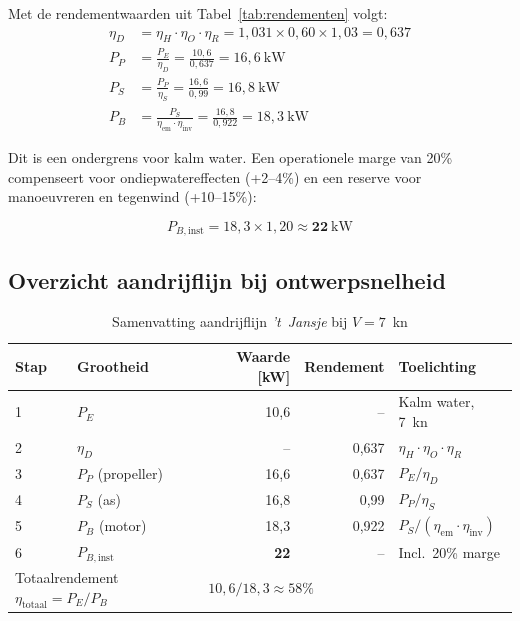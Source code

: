 Met de rendementwaarden uit Tabel~\ref{tab:rendementen} volgt:
\begin{align}
    \eta_D &= \eta_H \cdot \eta_O \cdot \eta_R
            = 1{,}031 \times 0{,}60 \times 1{,}03 = 0{,}637 \\[4pt]
    P_P    &= \frac{P_E}{\eta_D} = \frac{10{,}6}{0{,}637} = 16{,}6\ \mathrm{kW} \\[4pt]
    P_S    &= \frac{P_P}{\eta_S} = \frac{16{,}6}{0{,}99}  = 16{,}8\ \mathrm{kW} \\[4pt]
    P_B    &= \frac{P_S}{\eta_\mathrm{em} \cdot \eta_\mathrm{inv}}
            = \frac{16{,}8}{0{,}922} = 18{,}3\ \mathrm{kW}
\end{align}

Dit is een ondergrens voor kalm water. Een operationele marge van 20\%
compenseert voor ondiepwatereffecten (+2--4\%) en
een reserve voor manoeuvreren en tegenwind (+10--15\%):

\begin{equation}
    P_{B,\mathrm{inst}} = 18{,}3 \times 1{,}20 \approx \mathbf{22\ \mathrm{kW}}
    \label{eq:PB-inst}
\end{equation}

\subsection{Overzicht aandrijflijn bij ontwerpsnelheid}
\label{subsec:aandrijflijn-overzicht}

\begin{table}[H]
\centering
\caption{Samenvatting aandrijflijn \emph{'t~Jansje} bij $V = 7$~kn}
\label{tab:aandrijflijn-overzicht}
\begin{tabular}{llrrl}
\toprule
Stap & Grootheid & Waarde [kW] & Rendement & Toelichting \\
\midrule
1 & $P_E$                & 10{,}6      & --      & Kalm water, 7~kn \\
2 & $\eta_D$             & --          & 0{,}637 & $\eta_H \cdot \eta_O \cdot \eta_R$ \\
3 & $P_P$ (propeller)    & 16{,}6      & 0{,}637 & $P_E/\eta_D$ \\
4 & $P_S$ (as)           & 16{,}8      & 0{,}99  & $P_P/\eta_S$ \\
5 & $P_B$ (motor)        & 18{,}3      & 0{,}922 & $P_S/(\eta_\mathrm{em}\cdot\eta_\mathrm{inv})$ \\
6 & $P_{B,\mathrm{inst}}$& \textbf{22} & --      & Incl.\ 20\% marge \\
\midrule
\multicolumn{2}{l}{Totaalrendement $\eta_\mathrm{totaal} = P_E/P_B$}
    & \multicolumn{3}{l}{$10{,}6/18{,}3 \approx 58\%$} \\
\bottomrule
\end{tabular}
\end{table}

